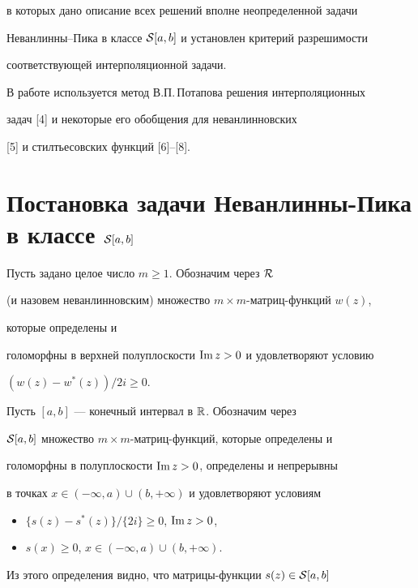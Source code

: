 в которых дано описание всех решений вполне неопределенной задачи


Неванлинны--Пика в классе ${\cal S}[a,b]$ и установлен критерий разрешимости


соответствующей интерполяционной задачи.





В работе используется метод В.П.\,Потапова решения интерполяционных


задач [4] и некоторые его обобщения для неванлинновских


[5] и стилтьесовских функций [6]--[8].





\section{Постановка задачи Неванлинны-Пика в классе ${\cal S}[a,b]$}





Пусть задано целое число $m\geq 1$. Обозначим через ${\cal R}$


(и назовем неванлинновским) множество $m \times m$-матриц-функций  $w(z)$,


которые определены и


голоморфны в верхней полуплоскости  $\operatorname{Im} z > 0$ и удовлетворяют условию


$(w(z)-w^*(z))/2i \geq 0$.





Пусть $[a,b]$ --- конечный интервал в $\Bbb R$. Обозначим через


${\cal S}[a,b]$ множество $m\times m$-матриц-функций, которые определены и


голоморфны в  полуплоскости $\operatorname{Im} z>0$, определены и непрерывны


в точках $x \in (-\infty,a) \cup (b, +\infty)$  и удовлетворяют условиям


\begin{itemize}


\item[1.]  $\{s(z)-s^*(z)\} / \{2i\} \geq 0$, $\operatorname{Im} z > 0$,


\item[2.]  $ s(x) \geq 0$, $x \in (-\infty,a) \cup (b, +\infty)$.


\end{itemize}


Из этого определения видно, что матрицы-функции $s(z)\in {\cal S}[a,b]$


